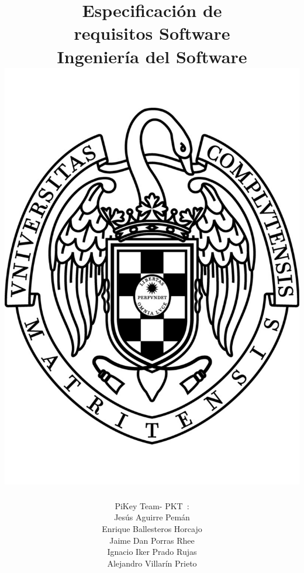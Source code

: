 \documentclass[spanish,a4paper,11pt, twoside]{report}	%
\newcommand*{\PKT}{\hbox{P}\kern-2.5pt\lower3.5pt\hbox{\small{K}}\kern-2.8pt\hbox{T}\kern-2pt}	%
\begin{document}
\title{\textbf{\huge{Especificación de \\ 
	requisitos Software}} \\ \vspace{0.3cm}
	\Large{Ingeniería del Software} \\
	\includegraphics[scale=0.3]{ucm.pdf}}
\author{{\Large{PiKey Team-}} \PKT \ : \vspace{0.2cm} \\
	Jesús Aguirre Pemán \\
	 Enrique Ballesteros Horcajo \\
	 Jaime Dan Porras Rhee \\
	 Ignacio Iker Prado Rujas \\
	 Alejandro Villarín Prieto }
\date{\Today}
\maketitle
\end{document}
